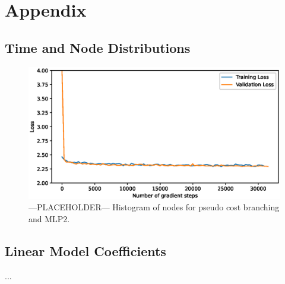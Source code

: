 \chapter{Appendix}\label{cha:appendix-my-appendix}
%

\section{Time and Node Distributions}\label{sec:distributions}
\begin{figure}[h]
    \centering
    \includegraphics[width=\textwidth]{img/loss70.eps}
    \caption{---PLACEHOLDER--- Histogram of nodes for pseudo cost branching and MLP2.}
    \label{fig:node_histogram}
\end{figure}


\section{Linear Model Coefficients}\label{sec:coefficients}
...
